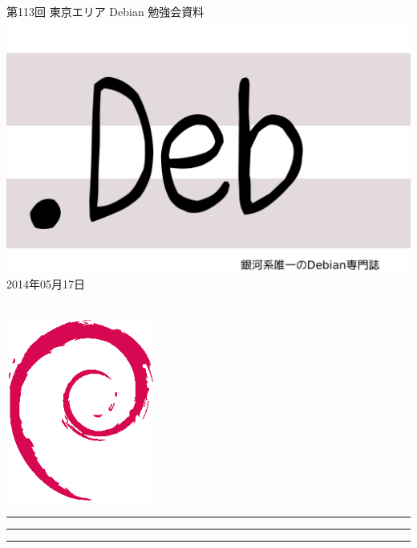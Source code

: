 \documentclass[mingoth,a4paper]{jsarticle}
\newcommand{\debmtgyear}{2014}
\newcommand{\debmtgmonth}{05}
\newcommand{\debmtgdate}{17}
\newcommand{\debmtgnumber}{113}
\begin{document}
\begin{titlepage}
\thispagestyle{empty}

\vspace*{-2cm}
第\debmtgnumber{}回 東京エリア Debian 勉強会資料\\
\hspace*{-2cm}
\includegraphics{image2012-natsu/dotdeb.pdf}\\
\hfill{}\debmtgyear{}年\debmtgmonth{}月\debmtgdate{}日

\\

\vspace*{-2cm}
\hfill{}\includegraphics[height=6cm]{image200502/openlogo-nd.eps}
\end{titlepage}

\newpage

\begin{minipage}[b]{0.2\hsize}
 \colorbox{titleback}{}
\end{minipage}
\begin{minipage}[b]{0.8\hsize}
\hrule
\vspace{2mm}
\hrule
\begin{multicols}{2}
\tableofcontents
\end{multicols}
\vspace{2mm}
\hrule
\end{minipage}
\end{document}
